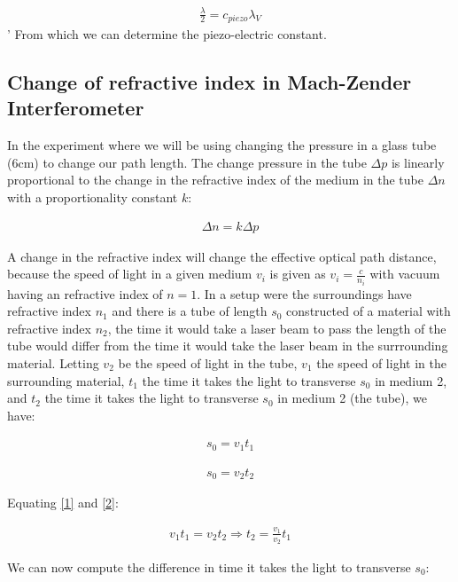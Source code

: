 \begin{align}
\frac{\lambda}{2} = c_{piezo}\lambda_V
\label{piezo}
\end{align}
'
From which we can determine the piezo-electric constant. 

\subsection{Change of refractive index in Mach-Zender Interferometer}

In the experiment where we will be using changing the pressure in a glass tube (6cm) to change our path length. The change pressure in the tube $\Delta p$ is linearly proportional to the change in the refractive index of the medium in the tube $\Delta n$ with a proportionality constant $k$:

\begin{align}
\Delta n = k \Delta p
\label{pn}
\end{align}

A change in the refractive index will change the effective optical path distance, because the speed of light in a given medium $v_i$ is given as $v_i=\frac{c}{n_i}$ with vacuum having an refractive index of $n=1$. In a setup were the surroundings have refractive index $n_1$ and there is a tube of length $s_0$ constructed of a material with refractive index $n_2$, the time it would take a laser beam to pass the length of the tube would differ from the time it would take the laser beam in the surrrounding material. Letting $v_2$ be the speed of light in the tube, $v_1$ the speed of light in the surrounding material, $t_1$ the time it takes the light to transverse $s_0$ in medium 2, and $t_2$ the time it takes the light to transverse $s_0$ in medium 2 (the tube), we have:

\begin{align}
s_0=v_1 t_1
\label{1}
\end{align}

\begin{align}
s_0 = v_2 t_2
\label{2}
\end{align}

Equating \ref{1} and \ref{2}:

\begin{align}
v_1 t_1 = v_2 t_2 \Rightarrow t_2 = \frac{v_1}{v_2}t_1
\label{t2}
\end{align}

We can now compute the difference in time it takes the light to transverse $s_0$:

